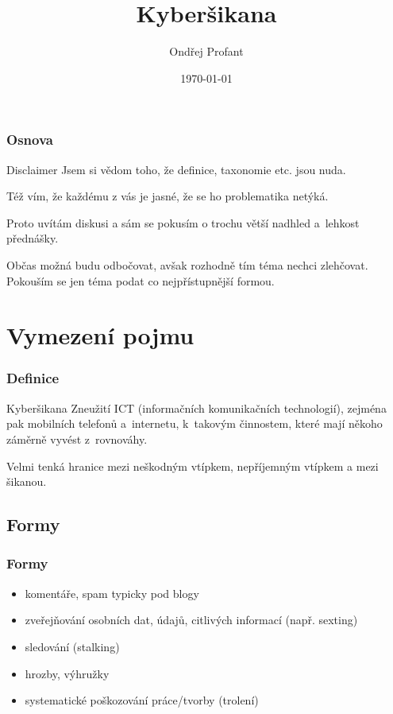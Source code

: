 \documentclass[xetex]{beamer}
\title{Kyberšikana}
\author{Ondřej Profant}
\institute[Piráti]{Česká pirátská strana}
\date{\today}
\begin{document}
\begin{frame}
  \titlepage
\end{frame}

\begin{frame}
  \frametitle{Osnova}
  \tableofcontents
\end{frame}	

\begin{frame}
  \begin{block}{Disclaimer}
  Jsem si vědom toho, že definice, taxonomie etc. jsou nuda.

	\medskip

	Též vím, že každému z vás je jasné, že se ho problematika netýká.

	\medskip

	Proto uvítám diskusi a sám se pokusím o trochu větší nadhled a~lehkost přednášky. 

	\medskip

	Občas možná budu odbočovat, avšak rozhodně tím téma nechci zlehčovat. Pokouším se jen téma podat co nejpřístupnější formou.
	\end{block}
\end{frame}

\section{Vymezení pojmu}
\begin{frame}
 \frametitle{Definice}
	\begin{block}{Kyberšikana}
	 Zneužití ICT (informačních komunikačních technologií), zejména pak mobilních telefonů a~internetu, k~takovým činnostem, které mají někoho záměrně vyvést z~rovnováhy.
	\end{block}

	\bigskip	

	Velmi tenká hranice mezi neškodným vtípkem, nepříjemným vtípkem a mezi šikanou.
\end{frame}

\subsection{Formy}

\begin{frame}
 \frametitle{Formy}
	\begin{itemize}
		\item komentáře, spam typicky pod blogy 
		\item zveřejňování osobních dat, údajů, citlivých informací (např. sexting)
		\item sledování (stalking)
		\item hrozby, výhružky
		\item systematické poškozování práce/tvorby (trolení)
	\end{itemize} 
\end{frame}
\end{document}
